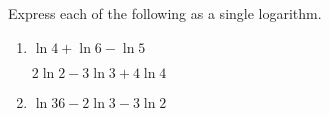 Express each of the following as a single logarithm.  

\begin{enumerate}
\item   $\ln 4 + \ln 6 - \ln 5$

 $2\ln 2 - 3\ln 3 + 4\ln 4$

%

\item   $\ln 36 - 2\ln 3 - 3\ln 2$

\end{enumerate}
